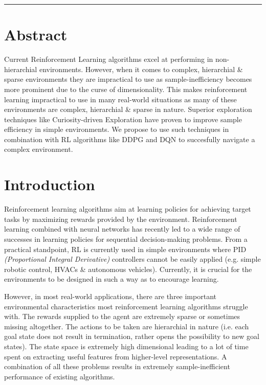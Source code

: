 \documentclass[12pt,a4paper]{article}
\begin{document}
\reviewtitle
\hrule

\section{Abstract}
Current Reinforcement Learning algorithms excel at performing in
non-hierarchial environments. However, when it comes to complex,
hierarchial \& sparse environments  they are impractical to use 
as sample-inefficiency becomes more prominent due to the curse of
dimensionality. This makes reinforcement learning impractical to 
use in many real-world situations as many  of these environments are 
complex, hierarchial \& sparse in  nature. Superior exploration techniques 
like Curiosity-driven Exploration have proven to improve sample efficiency 
in simple environments. We propose to use such techniques in combination 
with RL algorithms like DDPG and DQN to succesfully navigate a complex 
environment.

\section{Introduction}
Reinforcement learning algorithms aim at learning policies for achieving 
target tasks by maximizing rewards provided by the environment. Reinforcement
learning combined with neural networks has recently led to a wide range of 
successes in learning policies for sequential decision-making problems. From a
practical standpoint, RL is currently used in simple environments where PID 
\textit{(Proportional Integral Derivative)} controllers cannot be easily applied
(e.g. simple robotic control, HVACs \& autonomous vehicles). Currently, 
it is crucial for the environments to be designed in such a way as to encourage 
learning.

However, in most real-world applications, there are three important environmental
characteristics most reinforcement learning algorithms struggle with. The 
rewards supplied to the agent are extremely sparse or sometimes missing 
altogether. The actions  to be taken are hierarchial in nature (i.e. 
each goal state does not result in termination, rather opens the possibility 
to new goal states). The state space is extremely high dimensional leading 
to a lot of time spent on extracting useful features from higher-level 
representations. A combination of all these problems results in extremely 
sample-inefficient performance of existing algorithms.
\end{document}
